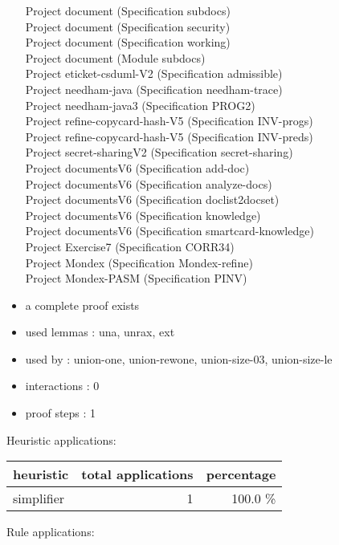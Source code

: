 \documentclass[a4paper]{article}
\begin{document}
\begin{itemize}
Project document (Specification subdocs) \\
Project document (Specification security) \\
Project document (Specification working) \\
Project document (Module subdocs) \\
Project eticket-csduml-V2 (Specification admissible) \\
Project needham-java (Specification needham-trace) \\
Project needham-java3 (Specification PROG2) \\
Project refine-copycard-hash-V5 (Specification INV-progs) \\
Project refine-copycard-hash-V5 (Specification INV-preds) \\
Project secret-sharingV2 (Specification secret-sharing) \\
Project documentsV6 (Specification add-doc) \\
Project documentsV6 (Specification analyze-docs) \\
Project documentsV6 (Specification doclist2docset) \\
Project documentsV6 (Specification knowledge) \\
Project documentsV6 (Specification smartcard-knowledge) \\
Project Exercise7 (Specification CORR34) \\
Project Mondex (Specification Mondex-refine) \\
Project Mondex-PASM (Specification PINV)
\item       a complete proof exists
\item       used lemmas  : una, unrax, ext
\item       used by      : union-one, union-rewone, union-size-03, union-size-le
\item       interactions : 0
\item       proof steps  : 1
\end{itemize}

\medskip


Heuristic applications:

\begin{supertabular}{l|r|r}
heuristic	& total applications & percentage \\ \hline
simplifier & 1 & 100.0 \% \\

\end{supertabular}

Rule applications:
\end{document}
